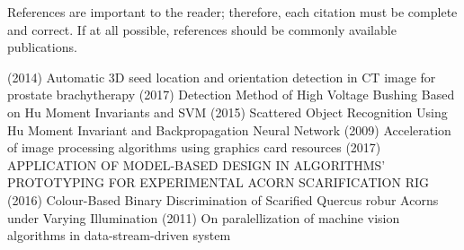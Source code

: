 \documentclass[letterpaper, 10 pt, conference]{ieeeconf}  %
\begin{document}

References are important to the reader; therefore, each citation must be complete and correct. If at all possible, references should be commonly available publications.


\begin{thebibliography}{99}

 (2014) Automatic 3D seed location and orientation detection in CT image for prostate brachytherapy
 (2017) Detection Method of High Voltage Bushing Based on Hu Moment Invariants and SVM
 (2015) Scattered Object Recognition Using Hu Moment Invariant and Backpropagation Neural Network
 (2009) Acceleration of image processing algorithms using graphics card resources
 (2017) APPLICATION OF MODEL-BASED DESIGN IN ALGORITHMS’ PROTOTYPING FOR EXPERIMENTAL ACORN SCARIFICATION RIG
 (2016) Colour-Based Binary Discrimination of Scarified Quercus robur Acorns under Varying Illumination
 (2011) On paralellization of machine vision algorithms in data-stream-driven system

\end{thebibliography}
\end{document}
